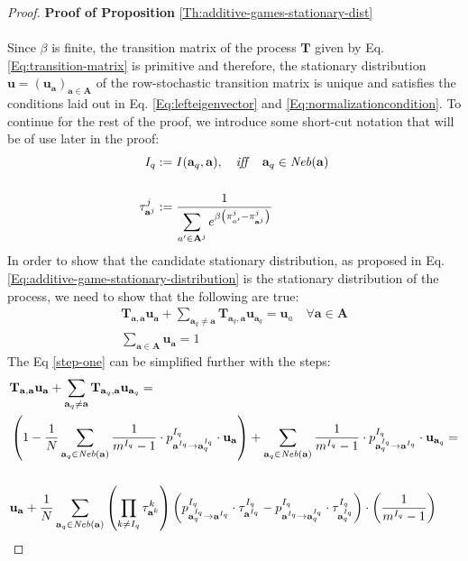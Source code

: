 \documentclass[11pt]{article}
\theoremstyle{plainCl1}
\theoremstyle{plainCl2}
\newcommand{\A}{\mathbf{A}}
\newcommand{\abf}{\mathbf{a}}
\newcommand{\T}{\mathbf{T}}
\newcommand{\ubf}{\mathbf{u}}
\begin{document}
\begin{proof}
\textbf{Proof of Proposition} \ref{Th:additive-games-stationary-dist} \\ \\ 
Since $\beta$ is finite, the transition matrix of the process $\T$ given by Eq. \ref{Eq:transition-matrix} is primitive and therefore, the stationary distribution $\ubf = (\ubf_\abf)_{\abf \in \A}$ of the row-stochastic transition matrix is unique and satisfies the conditions laid out in Eq. \ref{Eq:lefteigenvector} and \ref{Eq:normalizationcondition}. To continue for the rest of the proof, we introduce some short-cut notation that will be of use later in the proof:\\
\begin{align}
I_{q} &:= I(\abf_q,\abf), \quad \mathit{iff} \quad \abf_q \in \mathit{Neb}(\abf) \\ \notag \\ 
\label{Eq:shortcut-tau}
\tau^j_{\abf^j} &:= \frac{1}{\displaystyle \sum_{a' \in \A^j} e^{\beta \left( \pi^j_{a'} -  \pi^j_{\abf^j} \right) }} 
\end{align}
\noindent In order to show that the candidate stationary distribution, as proposed in Eq. \ref{Eq:additive-game-stationary-distribution} is the stationary distribution of the process, we need to show that the following are true:
\begin{eqnarray}
\label{step-one}
\T_{\abf,\abf} \ubf_\abf  + \sum_{\abf_q \neq \abf} \T_{\abf_q, \abf} \ubf_{\abf_q}= \ubf_a \quad \forall \abf \in \A \\ 
\label{step-two}
\sum_{\abf \in \A} \ubf_\abf  = 1
\end{eqnarray}
The Eq \ref{step-one} can be simplified further with the steps: 
\begin{align}
&\T_{\abf,\abf} \ubf_\abf  + \sum_{\abf_q \neq \abf} \T_{\abf_q, \abf} \ubf_{\abf_q}= \\
& \left( 1 - \frac{1}{N} \sum_{\abf_q \in \mathit{Neb}(\abf)} \frac{1}{m^{I_q}-1} \cdot p^{I_q}_{\abf^{I_q} \to \abf^{I_q}_q} \cdot \ubf_{\abf} \right) + \sum_{\abf_q \in \mathit{Neb}(\abf)}  \frac{1}{m^{I_q}-1} \cdot p^{I_q}_{\abf^{I_q}_q \to \abf^{I_q}} \cdot \ubf_{\abf_q} = \\ \notag \\
\label{eq:important-step}
& \ubf_\abf +  \frac{1}{N} \sum_{\abf_q \in \mathit{Neb}(\abf)} \left( \prod_{k \neq I_q} \tau^k_{\abf^k} \right) \left( p^{I_q}_{\abf^{I_q}_q \to \abf^{I_q}} \cdot \tau^{I_q}_{\abf^{I_q}} -  p^{I_q}_{\abf^{I_q} \to \abf^{I_q}_q} \cdot \tau^{I_q}_{\abf^{I_q}_q} \right) \cdot \left(  \frac{1}{m^{I_q}-1} \right)

\end{align}
\end{proof}
\end{document}
